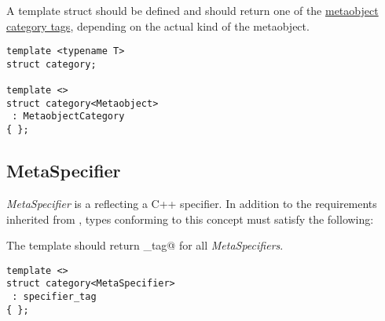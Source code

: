 A template struct \verb@category@ should be defined and should return one of the
\hyperref[metaobject-category-tags]{metaobject category tags}, depending on
the actual kind of the metaobject.

\begin{lstlisting}
template <typename T>
struct category;

template <>
struct category<Metaobject>
 : MetaobjectCategory
{ };
\end{lstlisting}

\subsection{MetaSpecifier}
\label{concept-MetaSpecifier}

{\em MetaSpecifier} is a  reflecting a C++ specifier. In addition to the requirements
inherited from , types conforming to this concept must satisfy the following:

The \verb@category@ template should return \verb@specifier_tag@ for all {\em MetaSpecifiers}.

\begin{lstlisting}
template <>
struct category<MetaSpecifier>
 : specifier_tag
{ };
\end{lstlisting}

